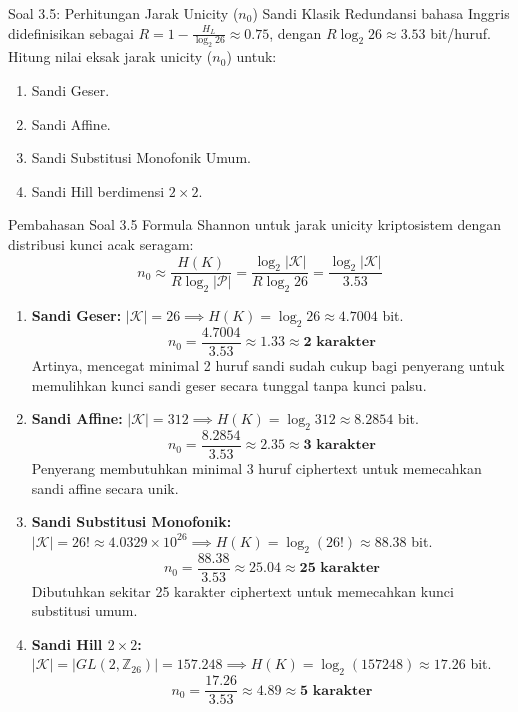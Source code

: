 \documentclass[11pt,a4paper]{article}
\begin{document}
\vspace{0.4cm}

\begin{soalbox}{Soal 3.5: Perhitungan Jarak Unicity ($n_0$) Sandi Klasik}
Redundansi bahasa Inggris didefinisikan sebagai $R = 1 - \frac{H_L}{\log_2 26} \approx 0.75$, dengan $R \log_2 26 \approx 3.53$ bit/huruf.
Hitung nilai eksak jarak unicity ($n_0$) untuk:
\begin{enumerate}[label=(\alph*)]
    \item Sandi Geser.
    \item Sandi Affine.
    \item Sandi Substitusi Monofonik Umum.
    \item Sandi Hill berdimensi $2 \times 2$.
\end{enumerate}
\end{soalbox}

\begin{solusibox}{Pembahasan Soal 3.5}
Formula Shannon untuk jarak unicity kriptosistem dengan distribusi kunci acak seragam:
\[
n_0 \approx \frac{H(K)}{R \log_2 |\mathcal{P}|} = \frac{\log_2 |\mathcal{K}|}{R \log_2 26} = \frac{\log_2 |\mathcal{K}|}{3.53}
\]
\begin{enumerate}[leftmargin=*]
    \item \textbf{Sandi Geser:}
    $|\mathcal{K}| = 26 \implies H(K) = \log_2 26 \approx 4.7004$ bit.
    \[
    n_0 = \frac{4.7004}{3.53} \approx 1.33 \approx \mathbf{2 \text{ karakter}}
    \]
    Artinya, mencegat minimal 2 huruf sandi sudah cukup bagi penyerang untuk memulihkan kunci sandi geser secara tunggal tanpa kunci palsu.
    \item \textbf{Sandi Affine:}
    $|\mathcal{K}| = 312 \implies H(K) = \log_2 312 \approx 8.2854$ bit.
    \[
    n_0 = \frac{8.2854}{3.53} \approx 2.35 \approx \mathbf{3 \text{ karakter}}
    \]
    Penyerang membutuhkan minimal 3 huruf ciphertext untuk memecahkan sandi affine secara unik.
    \item \textbf{Sandi Substitusi Monofonik:}
    $|\mathcal{K}| = 26! \approx 4.0329 \times 10^{26} \implies H(K) = \log_2(26!) \approx 88.38$ bit.
    \[
    n_0 = \frac{88.38}{3.53} \approx 25.04 \approx \mathbf{25 \text{ karakter}}
    \]
    Dibutuhkan sekitar 25 karakter ciphertext untuk memecahkan kunci substitusi umum.
    \item \textbf{Sandi Hill $2 \times 2$:}
    $|\mathcal{K}| = |GL(2, \mathbb{Z}_{26})| = 157.248 \implies H(K) = \log_2(157248) \approx 17.26$ bit.
    \[
    n_0 = \frac{17.26}{3.53} \approx 4.89 \approx \mathbf{5 \text{ karakter}}
    \]
\end{enumerate}
\end{solusibox}
\end{document}
